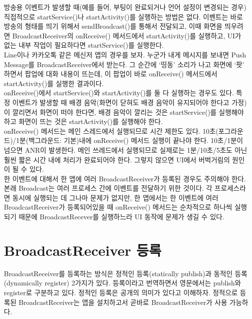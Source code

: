 방송용 이벤트가 발생할 때(예를 들어, 부팅이 완료되거나 언어 설정이 변경되는 경우) 직접적으로 startService()나 startActivity()를 실행하는 방법은 없다. 이벤트는 바로 방송의 형태를 띄기 위해서 sendBroadcast()를 통해서 전달되고, 이때 화면을 띄우려면 BroadcastReceiver의 onReceive() 메서드에서 startActivity()를 실행하고, UI가 없는 내부 작업이 필요하다면 startService()를 실행한다.\\

Line이나 카카오톡 같은 메신저 앱의 경우를 보자. 누군가 내게 메시지를 보내면 Push Message를 BroadcastReceiver에서 받는다. 그 순간에 `띵동' 소리가 나고 화면에 `팟' 하면서 팝업에 대화 내용이 뜨는데, 이 팝업이 바로 onReceive() 메서드에서 startActivity()를 실행한 결과이다.\\

onReceive()에서 startService()와 startActivity()를 둘 다 실행하는 경우도 있다. 특정 이벤트가 발생할 때 배경 음악(화면이 닫혀도 배경 음악이 유지되어야 한다고 가정)이 깔리면서 화면이 떠야 한다면, 배경 음악이 깔리는 것은 startService()를 실행해야 하고 화면이 뜨는 것은 startActivity()를 실행해야 한다.\\

onReceive() 메서드는 메인 스레드에서 실행되므로 시간 제한도 있다.
10초(포그라운드)/1분(백그라운드: 기본)내에 onReceive() 메서드 실행이 끝나야 한다. 10초/1분이 넘으면 ANR이 발생한다.
메인 쓰레드에서 실행되므로 실제로는 1분/10초/5초도 아닌 훨씬 짧은 시간 내에 처리가 완료되어야 한다. 그렇지 않으면 UI에서 버벅거림의 원인이 될 수 있다.\\

한 이벤트에 대해서 한 앱에 여러 BroadcastReceiver가 등록된 경우도 주의해야 한다.
본래 Broadcast는 여러 프로세스 간에 이벤트를 전달하기 위한 것이다. 각 프로세스라면 동시에 실행되는 데 그나마 문제가  없지만, 한 앱에서는 한 이벤트에 여러 BroadcastReceiver가 등록되어있을 때 onReceive() 메서드는 순차적으로 하나씩 실행되기 때문에 BroadcastRecever를 실행하느라 UI 동작에 문제가 생길 수 있다.\\

\begin{comment}
어떤 앱에서는 Application에만 registerReceiver를 해놓는 경우도 있다. BroadcastReceiver를 최소한의 개수로 하고, 최소한의 시간만 존재하도록 하는 것이 BroadcastReceiver로 인해 UI가 버벅거리지 않게 하는 방법이다.
\end{comment}

\section{BroadcastReceiver 등록}
BroadcastReceiver를 등록하는 방식은 정적인 등록(statically publish)과 동적인 등록(dynamically register) 2가지가 있다. 등록이라고 번역하면서 영문에서는 publish와 register로 구분하고 있다. 
정적인 등록은 공개의 의미가 있다고 이해하자. 정적으로 등록된 BroadcastReceiver는 앱을 설치하고서 곧바로 BroadcastReceiver가 사용 가능하다.\\

